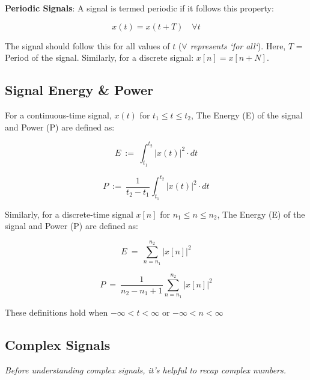 \documentclass[letterpaper,12pt]{article}
\begin{document}
\textbf{Periodic Signals}: A signal is termed periodic if it follows this property:

\begin{equation}
    x(t) = x(t + T) \quad \forall t
    \label{eq:periodic_signal_condition}
\end{equation}

The signal should follow this for all values of $t$ (\textit{$\forall$ represents `for all`}). Here, $T$ = Period of the signal. Similarly, for a discrete signal: \(x[n] = x[n + N]\).

\subsection*{Signal Energy \& Power}
For a continuous-time signal, $x(t)$ for $t_1 \le t \le t_2$, The Energy (E) of the signal and Power (P) are defined as:

\begin{equation}
    \label{eq:cont_time_energy}
    E\ :=\ \int_{t_{1}}^{t_{2}}\left|x\left(t\right)\right|^{2}\cdot dt
\end{equation}

\begin{equation}
    \label{eq:cont_time_power}
    P\ :=\ \frac{1}{t_{2}-t_{1}}\int_{t_{1}}^{t_{2}}\left|x\left(t\right)\right|^{2}\cdot dt
\end{equation}

Similarly, for a discrete-time signal $x[n]$ for $n_1 \le n \le n_2$, The Energy (E) of the signal and Power (P) are defined as:

\begin{equation}
    \label{eq:disc_time_energy}
    E\ =\ \sum_{n=n_{1}}^{n_{2}}\left|x\left[n\right]\right|^{2}
\end{equation}

\begin{equation}
    \label{eq:disc_time_power}
    P\ =\ \frac{1}{n_{2}-n_{1}+1}\sum_{n=n_{1}}^{n_{2}}\left|x\left[n\right]\right|^{2}
\end{equation}

These definitions hold when $-\infty < t < \infty$ or $-\infty < n < \infty$

\subsection*{Complex Signals}
\textit{Before understanding complex signals, it's helpful to recap complex numbers.}
\end{document}
